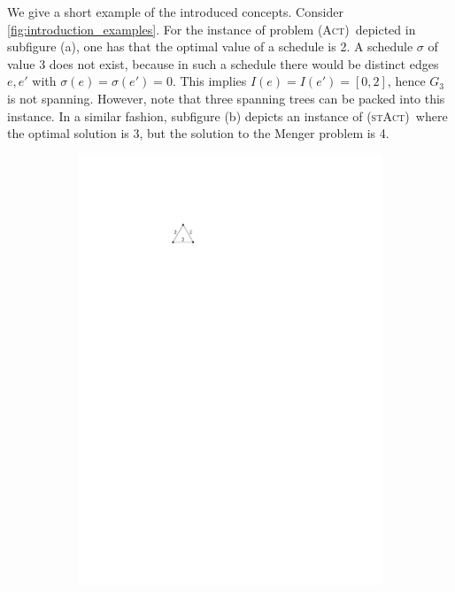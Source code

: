 \documentclass[runningheads]{llncs}
\numberwithin{equation}{section}
\newcommand{\act}{\textsc{(Act)}}
\newcommand{\stact}{\textsc{(stAct)}}
\begin{document}
We give a short example of the introduced concepts. Consider \cref{fig:introduction_examples}. For the instance of problem \act\ depicted in subfigure (a), one has that the optimal value of a schedule is 2. A schedule $\sigma$ of value 3 does not exist, because in such a schedule there would be distinct edges $e, e'$ with $\sigma(e) = \sigma(e') = 0$. This implies $I(e) = I(e') = [0, 2]$, hence $G_3$ is not spanning. However, note that three spanning trees can be packed into this instance. In a similar fashion, subfigure (b) depicts an instance of \stact\ where the optimal solution is 3, but the solution to the Menger problem is 4.
\begin{figure}
     \centering
     \begin{subfigure}[t]{0.3\textwidth}
         \centering
         \includegraphics[scale=1]{img/example-act}
         \label{fig:example_act}
     \end{subfigure}

\end{figure}
\end{document}
